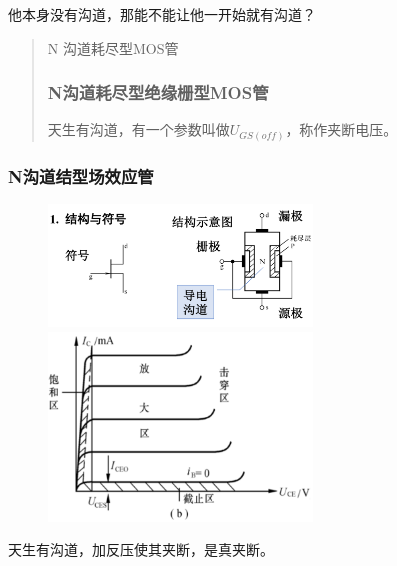 他本身没有沟道，那能不能让他一开始就有沟道？
\begin{quote}
{\qquad{}\ccwd\kaishu{}
N 沟道耗尽型MOS管
}
\subsubsection{N沟道耗尽型绝缘栅型MOS管}
天生有沟道，有一个参数叫做$U_{GS(off)}$，称作夹断电压。
\end{quote}
\subsubsection{N沟道结型场效应管}
        \begin{figure}[H]
            \centering
            \includegraphics[width=7cm]{img/1.8.png}
            \includegraphics[width=7cm]{img/1.9.png}

            \end{figure}
天生有沟道，加反压使其夹断，是真夹断。

